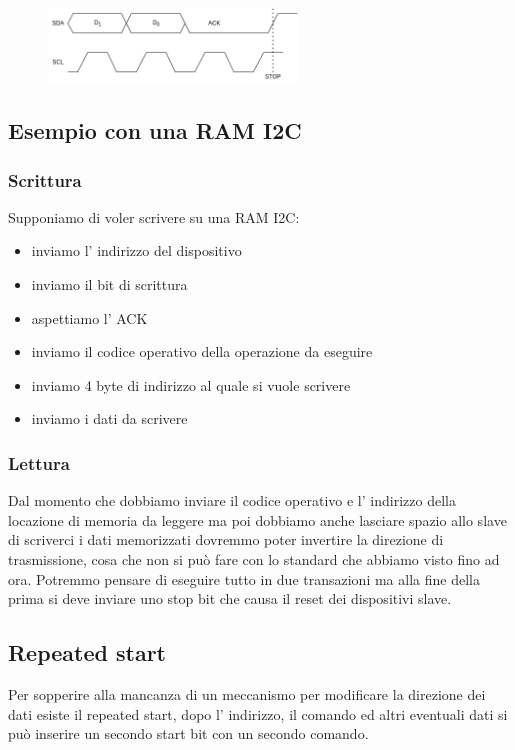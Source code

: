 \begin{figure}[H]
    \centering
    \includegraphics[width=250px]{images/24_I2C-TWI/i2c_ack_stop.png}
\end{figure}

\subsection{Esempio con una RAM I2C}
\subsubsection{Scrittura}
Supponiamo di voler scrivere su una RAM I2C:
\begin{itemize}
    \item inviamo l' indirizzo del dispositivo
    \item inviamo il bit di scrittura
    \item aspettiamo l' ACK
    \item inviamo il codice operativo della operazione da eseguire
    \item inviamo 4 byte di indirizzo al quale si vuole scrivere
    \item inviamo i dati da scrivere
\end{itemize}

\subsubsection{Lettura}
Dal momento che dobbiamo inviare il codice operativo e l' indirizzo della locazione di memoria da leggere ma poi dobbiamo anche lasciare spazio allo slave di scriverci i dati memorizzati dovremmo poter invertire la direzione di trasmissione, cosa che non si può fare con lo standard che abbiamo visto fino ad ora.
Potremmo pensare di eseguire tutto in due transazioni ma alla fine della prima si deve inviare uno stop bit che causa il reset dei dispositivi slave.

\subsection{Repeated start}
Per sopperire alla mancanza di un meccanismo per modificare la direzione dei dati esiste il repeated start, dopo l' indirizzo, il comando ed altri eventuali dati si può inserire un secondo start bit con un secondo comando.

